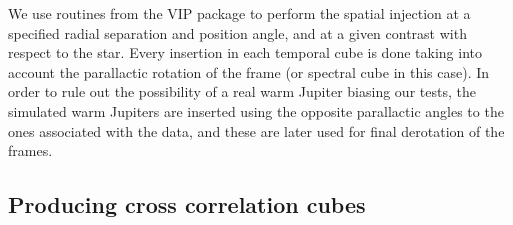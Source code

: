 \documentclass{aa}
\begin{document}
We use routines from the \textsc{VIP} package to perform the spatial injection at a specified radial separation and position angle, and at a given contrast with respect to the star.
Every insertion in each temporal cube is done taking into account the parallactic rotation of the frame (or spectral cube in this case).
In order to rule out the possibility of a real warm Jupiter biasing our tests, the simulated warm Jupiters are inserted using the opposite parallactic angles to the ones associated with the data, and these are later used for final derotation of the frames.


\subsection{Producing cross correlation cubes}\label{sec:specpreproc}

\end{document}
